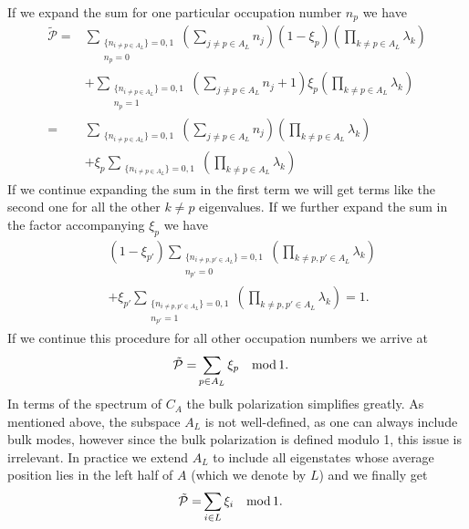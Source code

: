 \documentclass[twocolumn,amsmath,longbibliography,amssymb,superscriptaddress]{revtex4-1}
\begin{document}
If we expand the sum for one particular occupation number $n_p$ we have
\begin{align}
\tilde{\mathcal{P}} =& \sum_{\substack{\{n_{i \neq p \in A_L}\} = 0,1 \\ n_p=0}} \left(\sum_{j\neq p \in A_{L}} n_j \right) (1-\xi_p)\left(\prod_{k \neq p\in A_L} \lambda_k \right) \nonumber \\
&+ \sum_{\substack{\{n_{i \neq p \in A_L}\} = 0,1 \\ n_p=1}} \left(\sum_{j\neq p \in A_{L}} n_j+1 \right)\xi_p \left(\prod_{k \neq p\in A_L} \lambda_k \right) \nonumber \\
=& \sum_{\substack{\{n_{i \neq p \in A_L}\} = 0,1 }} \left(\sum_{j\neq p \in A_{L}} n_j \right) \left(\prod_{k \neq p\in A_L} \lambda_k \right) \nonumber \\
&+ \xi_p \sum_{\substack{\{n_{i \neq p \in A_L}\} = 0,1 }} \left(\prod_{k \neq p\in A_L} \lambda_k \right) 
\end{align}
If we continue expanding the sum in the first term we will get terms like the second one for all the other $k\neq p$ eigenvalues. If we further expand the sum in the factor accompanying $\xi_p$ we have
\begin{align}
&(1-\xi_{p'})\sum_{\substack{\{n_{i \neq p,p' \in A_L}\} = 0,1 \\ n_{p'}=0}} \left(\prod_{k \neq p,p'\in A_L} \lambda_k\right) \nonumber \\
&+ \xi_{p'}\sum_{\substack{\{n_{i \neq p,p' \in A_L}\} = 0,1 \\ n_{p'}=1}} \left(\prod_{k \neq p,p'\in A_L}\lambda_k\right) =1.
\end{align}
If we continue this procedure for all other occupation numbers we arrive at
\begin{align}
\tilde{\mathcal{P}} =& \sum_{p\in A_L}\xi_p  \quad {\rm mod}\, 1.
\end{align}
In terms of the spectrum of $C_A$ the bulk polarization simplifies greatly. As mentioned above, the subspace $A_L$ is not well-defined, as one can always include bulk modes, however since the bulk polarization is defined modulo 1, this issue is irrelevant. In practice we extend $A_L$ to include all eigenstates whose average position lies in the left half of $A$ (which we denote by $L$) and we finally get
\begin{align}
\tilde{\mathcal{P}} =& \sum_{i\in L}\xi_i \quad {\rm mod}\, 1.
\label{eq:polarization_left}
\end{align}
\end{document}
